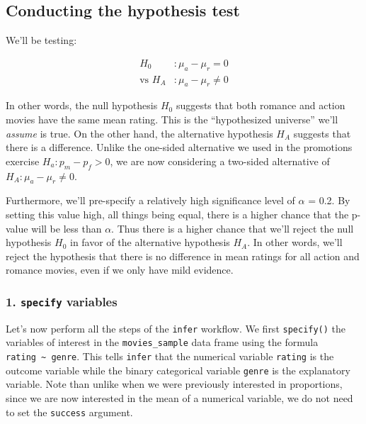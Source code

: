 \documentclass[
]{book}
\begin{document}
\hypertarget{conducting-the-hypothesis-test}{%
\subsection{Conducting the hypothesis test}\label{conducting-the-hypothesis-test}}

We'll be testing:

\[
\begin{aligned}
H_0 &: \mu_a - \mu_r = 0\\
\text{vs } H_A&: \mu_a - \mu_r \neq 0
\end{aligned}
\]

In other words, the null hypothesis \(H_0\) suggests that both romance and action movies have the same mean rating. This is the ``hypothesized universe'' we'll \emph{assume} is true. On the other hand, the alternative hypothesis \(H_A\) suggests that there is a difference. Unlike the one-sided alternative we used in the promotions exercise \(H_a: p_m - p_f > 0\), we are now considering a two-sided alternative of \(H_A: \mu_a - \mu_r \neq 0\).

Furthermore, we'll pre-specify a relatively high significance level of \(\alpha\) = 0.2. By setting this value high, all things being equal, there is a higher chance that the p-value will be less than \(\alpha\). Thus there is a higher chance that we'll reject the null hypothesis \(H_0\) in favor of the alternative hypothesis \(H_A\). In other words, we'll reject the hypothesis that there is no difference in mean ratings for all action and romance movies, even if we only have mild evidence.

\hypertarget{specify-variables-1}{%
\subsubsection*{\texorpdfstring{1. \texttt{specify} variables}{1. specify variables}}\label{specify-variables-1}}

Let's now perform all the steps of the \texttt{infer} workflow. We first \texttt{specify()} the variables of interest in the \texttt{movies\_sample} data frame using the formula \texttt{rating\ \textasciitilde{}\ genre}. This tells \texttt{infer} that the numerical variable \texttt{rating} is the outcome variable while the binary categorical variable \texttt{genre} is the explanatory variable. Note than unlike when we were previously interested in proportions, since we are now interested in the mean of a numerical variable, we do not need to set the \texttt{success} argument.
\end{document}
